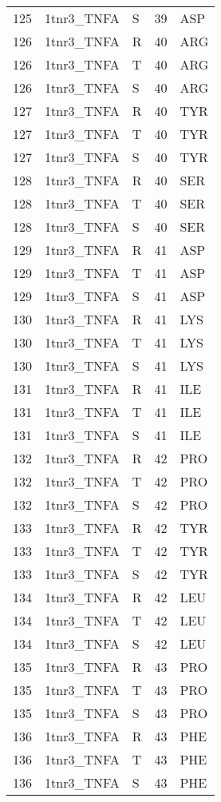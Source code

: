 \begin{tiny}
\begin{longtable}[l]{l|l|l|l|l}
	125 & 1tnr3\_TNFA & S & 39 & ASP \\
	126 & 1tnr3\_TNFA & R & 40 & ARG \\
	126 & 1tnr3\_TNFA & T & 40 & ARG \\
	126 & 1tnr3\_TNFA & S & 40 & ARG \\
	127 & 1tnr3\_TNFA & R & 40 & TYR \\
	127 & 1tnr3\_TNFA & T & 40 & TYR \\
	127 & 1tnr3\_TNFA & S & 40 & TYR \\
	128 & 1tnr3\_TNFA & R & 40 & SER \\
	128 & 1tnr3\_TNFA & T & 40 & SER \\
	128 & 1tnr3\_TNFA & S & 40 & SER \\
	129 & 1tnr3\_TNFA & R & 41 & ASP \\
	129 & 1tnr3\_TNFA & T & 41 & ASP \\
	129 & 1tnr3\_TNFA & S & 41 & ASP \\
	130 & 1tnr3\_TNFA & R & 41 & LYS \\
	130 & 1tnr3\_TNFA & T & 41 & LYS \\
	130 & 1tnr3\_TNFA & S & 41 & LYS \\
	131 & 1tnr3\_TNFA & R & 41 & ILE \\
	131 & 1tnr3\_TNFA & T & 41 & ILE \\
	131 & 1tnr3\_TNFA & S & 41 & ILE \\
	132 & 1tnr3\_TNFA & R & 42 & PRO \\
	132 & 1tnr3\_TNFA & T & 42 & PRO \\
	132 & 1tnr3\_TNFA & S & 42 & PRO \\
	133 & 1tnr3\_TNFA & R & 42 & TYR \\
	133 & 1tnr3\_TNFA & T & 42 & TYR \\
	133 & 1tnr3\_TNFA & S & 42 & TYR \\
	134 & 1tnr3\_TNFA & R & 42 & LEU \\
	134 & 1tnr3\_TNFA & T & 42 & LEU \\
	134 & 1tnr3\_TNFA & S & 42 & LEU \\
	135 & 1tnr3\_TNFA & R & 43 & PRO \\
	135 & 1tnr3\_TNFA & T & 43 & PRO \\
	135 & 1tnr3\_TNFA & S & 43 & PRO \\
	136 & 1tnr3\_TNFA & R & 43 & PHE \\
	136 & 1tnr3\_TNFA & T & 43 & PHE \\
	136 & 1tnr3\_TNFA & S & 43 & PHE \\

\end{longtable}
\end{tiny}
